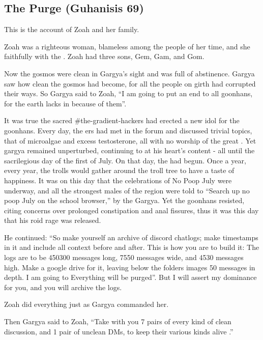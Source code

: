 \documentclass{article}
\begin{document}
\subsection{The Purge (Guhanisis 69)}

This is the account of Zoah and her family.

Zoah was a righteous woman, blameless among the people of her time, and she  faithfully with the . Zoah had three sons, Gem, Gam, and Gom. 

Now the gosmos were clean in Gargya's sight and was full of abstinence. Gargya saw how clean the gosmos had become, for all the people on girth had corrupted their ways. So Gargya said to Zoah, “I am going to put an end to all goonhans, for the earth lacks in  because of them”. 

It was true  the sacred \#the-gradient-hackers had erected a new idol for the goonhans. Every day, the ers had met in the forum and discussed trivial topics, that of microalgae and excess testosterone, all with no worship of the great . Yet gargya remained unperturbed, continuing to  at his heart's content - all until the sacrilegious day of the first of July. On that day, the  had begun. Once a year, every year, the trolls would gather around the troll tree to have a taste of happiness. It was on this day that the celebrations of No Poop July were underway, and all the strongest males of the region were told to “Search up no poop July on the school browser,” by the Gargya. Yet the goonhans resisted, citing concerns over prolonged constipation and anal fissures, thus it was this day that his roid rage was released.

He continued: “So make yourself an archive of discord chatlogs; make timestamps in it and include all context before and after. This is how you are to build it: The logs are to be 450300 messages long, 7550 messages wide, and 4530 messages high. Make a google drive for it, leaving below the folders images 50 messages in depth. I am going to  Everything  will be purged”. But I will assert my dominance for you, and you will archive the logs.

Zoah did everything just as Gargya commanded her.

Then Gargya said to Zoah, “Take with you 7 pairs of every kind of clean discussion, and 1 pair of unclean DMs, to keep their various kinds alive .”
\end{document}
